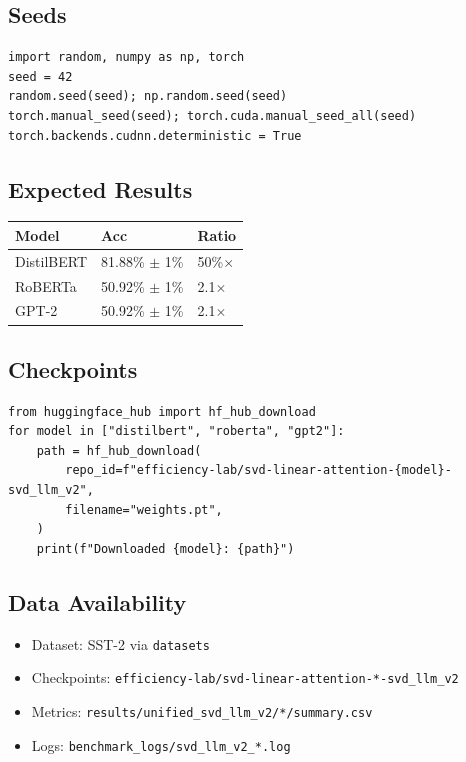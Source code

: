 \subsection{Seeds}

\begin{lstlisting}
import random, numpy as np, torch
seed = 42
random.seed(seed); np.random.seed(seed)
torch.manual_seed(seed); torch.cuda.manual_seed_all(seed)
torch.backends.cudnn.deterministic = True
\end{lstlisting}

\subsection{Expected Results}

\begin{table}[H]
\centering
\small
\begin{tabular}{lll}
\toprule
\textbf{Model} & \textbf{Acc} & \textbf{Ratio} \\
\midrule
DistilBERT & 81.88\% $\pm$ 1\% & 50\%$\times$ \\
RoBERTa & 50.92\% $\pm$ 1\% & 2.1$\times$ \\
GPT-2 & 50.92\% $\pm$ 1\% & 2.1$\times$ \\
\bottomrule
\end{tabular}
\end{table}

\subsection{Checkpoints}

\begin{lstlisting}
from huggingface_hub import hf_hub_download
for model in ["distilbert", "roberta", "gpt2"]:
    path = hf_hub_download(
        repo_id=f"efficiency-lab/svd-linear-attention-{model}-svd_llm_v2",
        filename="weights.pt",
    )
    print(f"Downloaded {model}: {path}")
\end{lstlisting}

\subsection{Data Availability}

\begin{itemize}
\item Dataset: SST-2 via \texttt{datasets}
\item Checkpoints: \texttt{efficiency-lab/svd-linear-attention-*-svd\_llm\_v2}
\item Metrics: \texttt{results/unified\_svd\_llm\_v2/*/summary.csv}
\item Logs: \texttt{benchmark\_logs/svd\_llm\_v2\_*.log}

\end{itemize}
